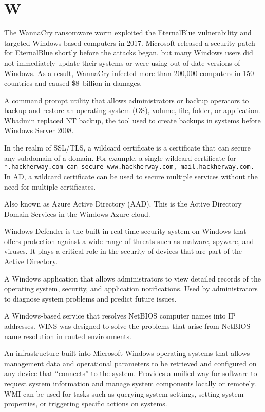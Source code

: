 \section*{W}
 The WannaCry ransomware worm exploited the EternalBlue vulnerability and targeted Windows-based computers in 2017. Microsoft released a security patch for EternalBlue shortly before the attacks began, but many Windows users did not immediately update their systems or were using out-of-date versions of Windows. As a result, WannaCry infected more than 200,000 computers in 150 countries and caused \$8~billion in damages.

 A command prompt utility that allows administrators or backup operators to backup and restore an operating system (OS), volume, file, folder, or application. Wbadmin replaced NT backup, the tool used to create backups in systems before Windows Server 2008.

 In the realm of SSL/TLS, a wildcard certificate is a certificate that can secure any subdomain of a domain. For example, a single wildcard certificate for \texttt{*.hackherway.com can secure www.hackherway.com, mail.hackherway.com.} In AD, a wildcard certificate can be used to secure multiple services without the need for multiple certificates.

 Also known as Azure Active Directory (AAD). This is the Active Directory Domain Services in the Windows Azure cloud.

 Windows Defender is the built-in real-time security system on Windows that offers protection against a wide range of threats such as malware, spyware, and viruses. It plays a critical role in the security of devices that are part of the Active Directory.

 A Windows application that allows administrators to view detailed records of the operating system, security, and application notifications. Used by administrators to diagnose system problems and predict future issues.

 A Windows-based service that resolves NetBIOS computer names into IP addresses. WINS was designed to solve the problems that arise from NetBIOS name resolution in routed environments.

 An infrastructure built into Microsoft Windows operating systems that allows management data and operational parameters to be retrieved and configured on any device that “connects” to the system. Provides a unified way for software to request system information and manage system components locally or remotely. WMI can be used for tasks such as querying system settings, setting system properties, or triggering specific actions on systems.

